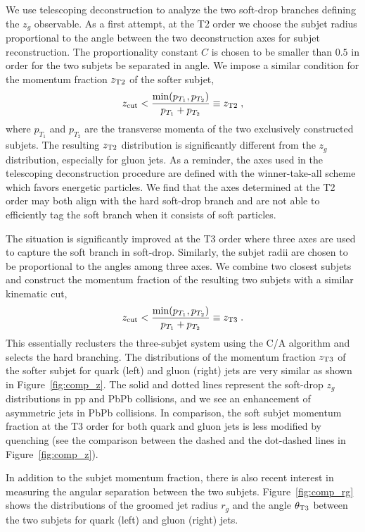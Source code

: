 \documentclass[notoc]{JHEP3}
\begin{document}
We use telescoping deconstruction to analyze the two soft-drop branches defining the $z_g$ observable. As a first attempt, at the T2 order we choose the subjet radius proportional to the angle between the two deconstruction axes for subjet reconstruction. The proportionality constant $C$ is chosen to be smaller than $0.5$ in order for the two subjets be separated in angle. We impose a similar condition for the momentum fraction $z_{\rm T2}$ of the softer subjet,
\begin{equation}
    z_{\rm cut} < \frac{\min(p_{T_1},p_{T_2})}{p_{T_1}+p_{T_2}} \equiv z_{\rm T2}\;,
\label{T2_z}
\end{equation}
where $p_{T_1}$ and $p_{T_2}$ are the transverse momenta of the two exclusively constructed subjets. The resulting $z_{\rm T2}$ distribution is significantly different from the $z_g$ distribution, especially for gluon jets.  As a reminder, the axes used in the telescoping deconstruction procedure are defined with the winner-take-all scheme which favors energetic particles. We find that the axes determined at the T2 order may both align with the hard soft-drop branch and are not able to efficiently tag the soft branch when it consists of soft particles.

The situation is significantly improved at the T3 order where three axes are used to capture the soft branch in soft-drop. Similarly, the subjet radii are chosen to be proportional to the angles among three axes. We combine two closest subjets and construct the momentum fraction of the resulting two subjets with a similar kinematic cut,
\begin{equation}
    z_{\rm cut} < \frac{\min(p_{T_1},p_{T_2})}{p_{T_1}+p_{T_2}} \equiv z_{\rm T3}\;.
\label{T3_z}
\end{equation}
This essentially reclusters the three-subjet system using the C/A algorithm and selects the hard branching. The distributions of the momentum fraction $z_{\rm T3}$ of the softer subjet for quark (left) and gluon (right) jets are very similar as shown in Figure~\ref{fig:comp_z}. The solid and dotted lines represent the soft-drop $z_{g}$ distributions in pp and PbPb collisions, and we see an enhancement of asymmetric jets in PbPb collisions. In comparison, the soft subjet momentum fraction at the T3 order for both quark and gluon jets is less modified by quenching (see the comparison between the dashed and the dot-dashed lines in Figure~\ref{fig:comp_z}).

In addition to the subjet momentum fraction, there is also recent interest in measuring the angular separation between the two subjets. Figure~\ref{fig:comp_rg} shows the distributions of the groomed jet radius $r_g$ and the angle $\theta_{\rm T3}$ between the two subjets for quark (left) and gluon (right) jets.
\end{document}
